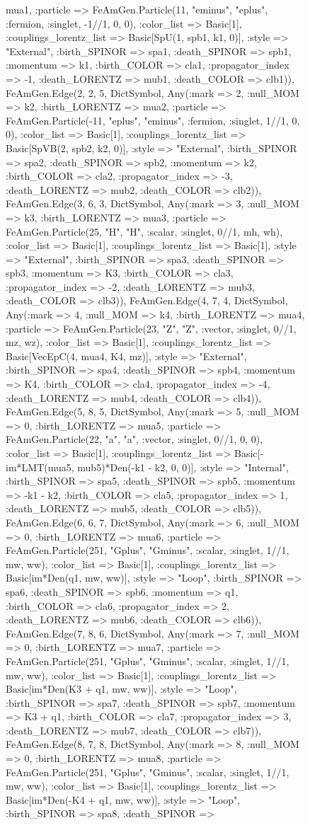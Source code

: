 \documentclass{revtex4}
\begin{document}
\begin{figure}[!htb]
\begin{center}
{mua1, :particle => FeAmGen.Particle(11, "eminus", "eplus", :fermion, :singlet, -1//1, 0, 0), :color_list => Basic[1], :couplings_lorentz_list => Basic[SpU(1, spb1, k1, 0)], :style => "External", :birth_SPINOR => spa1, :death_SPINOR => spb1, :momentum => k1, :birth_COLOR => cla1, :propagator_index => -1, :death_LORENTZ => mub1, :death_COLOR => clb1)), FeAmGen.Edge(2, 2, 5, Dict{Symbol, Any}(:mark => 2, :null_MOM => k2, :birth_LORENTZ => mua2, :particle => FeAmGen.Particle(-11, "eplus", "eminus", :fermion, :singlet, 1//1, 0, 0), :color_list => Basic[1], :couplings_lorentz_list => Basic[SpVB(2, spb2, k2, 0)], :style => "External", :birth_SPINOR => spa2, :death_SPINOR => spb2, :momentum => k2, :birth_COLOR => cla2, :propagator_index => -3, :death_LORENTZ => mub2, :death_COLOR => clb2)), FeAmGen.Edge(3, 6, 3, Dict{Symbol, Any}(:mark => 3, :null_MOM => k3, :birth_LORENTZ => mua3, :particle => FeAmGen.Particle(25, "H", "H", :scalar, :singlet, 0//1, mh, wh), :color_list => Basic[1], :couplings_lorentz_list => Basic[1], :style => "External", :birth_SPINOR => spa3, :death_SPINOR => spb3, :momentum => K3, :birth_COLOR => cla3, :propagator_index => -2, :death_LORENTZ => mub3, :death_COLOR => clb3)), FeAmGen.Edge(4, 7, 4, Dict{Symbol, Any}(:mark => 4, :null_MOM => k4, :birth_LORENTZ => mua4, :particle => FeAmGen.Particle(23, "Z", "Z", :vector, :singlet, 0//1, mz, wz), :color_list => Basic[1], :couplings_lorentz_list => Basic[VecEpC(4, mua4, K4, mz)], :style => "External", :birth_SPINOR => spa4, :death_SPINOR => spb4, :momentum => K4, :birth_COLOR => cla4, :propagator_index => -4, :death_LORENTZ => mub4, :death_COLOR => clb4)), FeAmGen.Edge(5, 8, 5, Dict{Symbol, Any}(:mark => 5, :null_MOM => 0, :birth_LORENTZ => mua5, :particle => FeAmGen.Particle(22, "a", "a", :vector, :singlet, 0//1, 0, 0), :color_list => Basic[1], :couplings_lorentz_list => Basic[-im*LMT(mua5, mub5)*Den(-k1 - k2, 0, 0)], :style => "Internal", :birth_SPINOR => spa5, :death_SPINOR => spb5, :momentum => -k1 - k2, :birth_COLOR => cla5, :propagator_index => 1, :death_LORENTZ => mub5, :death_COLOR => clb5)), FeAmGen.Edge(6, 6, 7, Dict{Symbol, Any}(:mark => 6, :null_MOM => 0, :birth_LORENTZ => mua6, :particle => FeAmGen.Particle(251, "Gplus", "Gminus", :scalar, :singlet, 1//1, mw, ww), :color_list => Basic[1], :couplings_lorentz_list => Basic[im*Den(q1, mw, ww)], :style => "Loop", :birth_SPINOR => spa6, :death_SPINOR => spb6, :momentum => q1, :birth_COLOR => cla6, :propagator_index => 2, :death_LORENTZ => mub6, :death_COLOR => clb6)), FeAmGen.Edge(7, 8, 6, Dict{Symbol, Any}(:mark => 7, :null_MOM => 0, :birth_LORENTZ => mua7, :particle => FeAmGen.Particle(251, "Gplus", "Gminus", :scalar, :singlet, 1//1, mw, ww), :color_list => Basic[1], :couplings_lorentz_list => Basic[im*Den(K3 + q1, mw, ww)], :style => "Loop", :birth_SPINOR => spa7, :death_SPINOR => spb7, :momentum => K3 + q1, :birth_COLOR => cla7, :propagator_index => 3, :death_LORENTZ => mub7, :death_COLOR => clb7)), FeAmGen.Edge(8, 7, 8, Dict{Symbol, Any}(:mark => 8, :null_MOM => 0, :birth_LORENTZ => mua8, :particle => FeAmGen.Particle(251, "Gplus", "Gminus", :scalar, :singlet, 1//1, mw, ww), :color_list => Basic[1], :couplings_lorentz_list => Basic[im*Den(-K4 + q1, mw, ww)], :style => "Loop", :birth_SPINOR => spa8, :death_SPINOR => }
\end{center}
\end{figure}
\end{document}
